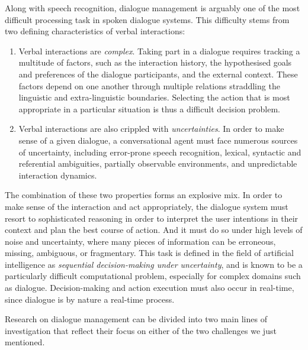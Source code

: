 Along with speech recognition, dialogue management is arguably one of the most difficult processing task in spoken dialogue systems. This difficulty stems from two defining characteristics of verbal interactions:
\begin{enumerate}
\item Verbal interactions are \textit{complex}.   Taking part in a dialogue requires tracking a multitude of factors, such as the interaction history, the hypothesised goals and preferences of the dialogue participants, and the external context. These factors depend on one another through multiple relations straddling the linguistic and extra-linguistic boundaries.  Selecting the action that is most appropriate in a particular situation is thus a difficult decision problem. 

\item Verbal interactions are also crippled with \textit{uncertainties}.  In order to make sense of a given dialogue, a conversational agent must face numerous sources of uncertainty, including error-prone speech recognition, lexical,  syntactic and referential ambiguities, partially observable environments, and unpredictable interaction dynamics.  
\end{enumerate} 

The combination of these two properties forms an explosive mix.  In order to make sense of the interaction and act appropriately, the dialogue system must resort to sophisticated reasoning in order to interpret the user intentions in their context and plan the best course of action.  And it must do so under high levels of noise and uncertainty, where many pieces of information can be erroneous, missing, ambiguous, or fragmentary. This task is defined in the field of artificial intelligence as \textit{sequential decision-making under uncertainty}, and is known to be a particularly difficult computational problem, especially for complex domains such as dialogue. 
Decision-making and action execution must also occur in real-time, since dialogue is by nature a real-time process. 


Research on dialogue management can be divided into two main lines of investigation that reflect their focus on either of the two challenges we just mentioned.  


